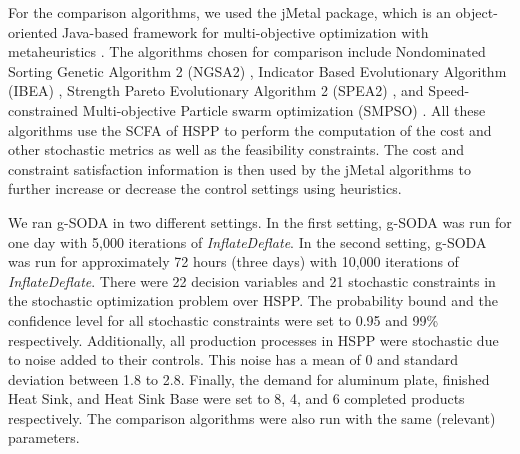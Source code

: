 \documentclass[a4paper, 12pt]{article} %
\begin{document}
For the comparison algorithms, we used the jMetal package, which is an object-oriented Java-based framework for multi-objective optimization with metaheuristics \cite{jMetal}. The algorithms chosen for comparison include Nondominated Sorting Genetic Algorithm 2 (NGSA2) \cite{ngsa2}, Indicator Based Evolutionary Algorithm (IBEA) \cite{ibea}, Strength Pareto Evolutionary Algorithm 2 (SPEA2) \cite{spea2}, and Speed-constrained Multi-objective Particle swarm optimization (SMPSO) \cite{NDG09}.
All these algorithms use the SCFA of HSPP to perform the computation of the cost and other stochastic metrics as well as the feasibility constraints. The cost and constraint satisfaction information is then used by the jMetal algorithms to further increase or decrease the control settings using heuristics.

We ran g-SODA in two different settings. 
In the first setting, g-SODA was run for one day with 5,000 iterations of \textit{InflateDeflate}. In the second setting, g-SODA was run for approximately 72 hours (three days) with 10,000 iterations of \textit{InflateDeflate}. There were 22 decision variables and 21 stochastic constraints in the stochastic optimization problem over HSPP. The probability bound and the confidence level for all stochastic constraints were set to 0.95 and 99\% respectively. Additionally, all production processes in HSPP were stochastic due to noise added to their controls. This noise has a mean of 0 and standard deviation between 1.8 to 2.8. 
Finally, the demand for aluminum plate, finished Heat Sink, and Heat Sink Base were set to 8, 4, and 6 completed products respectively.
The comparison algorithms were also run with the same (relevant) parameters.
\end{document}
